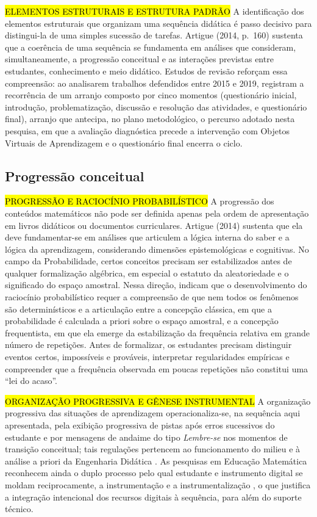 {\hl{ELEMENTOS ESTRUTURAIS E ESTRUTURA PADRÃO} A identificação dos elementos estruturais que organizam uma sequência didática é passo decisivo para distingui-la de uma simples sucessão de tarefas. Artigue (2014, p.~160) sustenta que a coerência de uma sequência se fundamenta em análises que consideram, simultaneamente, a progressão conceitual e as interações previstas entre estudantes, conhecimento e meio didático. Estudos de revisão reforçam essa compreensão: ao analisarem trabalhos defendidos entre 2015 e 2019,  registram a recorrência de um arranjo composto por cinco momentos (questionário inicial, introdução, problematização, discussão e resolução das atividades, e questionário final), arranjo que antecipa, no plano metodológico, o percurso adotado nesta pesquisa, em que a avaliação diagnóstica precede a intervenção com Objetos Virtuais de Aprendizagem e o questionário final encerra o ciclo.

\subsection{Progressão conceitual}

\hl {PROGRESSÃO E RACIOCÍNIO PROBABILÍSTICO} A progressão dos conteúdos matemáticos não pode ser definida apenas pela ordem de apresentação em livros didáticos ou documentos curriculares. Artigue (2014) sustenta que ela deve fundamentar-se em análises que articulem a lógica interna do saber e a lógica da aprendizagem, considerando dimensões epistemológicas e cognitivas. No campo da Probabilidade, certos conceitos precisam ser estabilizados antes de qualquer formalização algébrica, em especial o estatuto da aleatoriedade e o significado do espaço amostral. Nessa direção,  indicam que o desenvolvimento do raciocínio probabilístico requer a compreensão de que nem todos os fenômenos são determinísticos e a articulação entre a concepção clássica, em que a probabilidade é calculada a priori sobre o espaço amostral, e a concepção frequentista, em que ela emerge da estabilização da frequência relativa em grande número de repetições. Antes de formalizar, os estudantes precisam distinguir eventos certos, impossíveis e prováveis, interpretar regularidades empíricas e compreender que a frequência observada em poucas repetições não constitui uma ``lei do acaso''.

\hl {ORGANIZAÇÃO PROGRESSIVA E GÊNESE INSTRUMENTAL} A organização progressiva das situações de aprendizagem operacionaliza-se, na sequência aqui apresentada, pela exibição progressiva de pistas após erros sucessivos do estudante e por mensagens de andaime do tipo \emph{Lembre-se} nos momentos de transição conceitual; tais regulações pertencem ao funcionamento do milieu \cite{brousseau2002} e à análise a priori da Engenharia Didática \cite{artigue2014}. As pesquisas em Educação Matemática reconhecem ainda o duplo processo pelo qual estudante e instrumento digital se moldam reciprocamente, a instrumentação e a instrumentalização \cite{trouche2004}, o que justifica a integração intencional dos recursos digitais à sequência, para além do suporte técnico.

}
